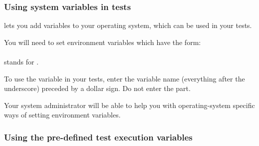 \subsubsection{Using system variables in tests}
\label{TasksSystemVariables}


\app{} lets you add variables to your operating system, which can be used in your tests. 

You will need to set environment variables which have the form:\\

\\

 stands for . 

To use the variable in your tests, enter the variable name (everything after the underscore) preceded by a dollar sign. Do not enter the  part.


Your system administrator will be able to help you with operating-system specific ways of setting environment variables. 



\subsubsection{Using the \app{}pre-defined test execution variables}
\label{TasksPredefinedVariables}

